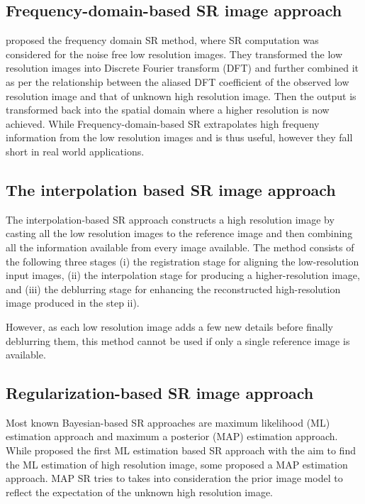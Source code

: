 \documentclass[12pt, letterpaper]{article}
\begin{document}
		\subsection{Frequency-domain-based SR image approach}
	  		\hspace*{0.25 in} \cite{tsai1984multiframe} proposed the frequency domain SR method, where SR computation was considered for the noise free low resolution images. They transformed the low resolution images into Discrete Fourier transform (DFT) and further combined it as per the relationship between the aliased DFT coefficient of the observed low resolution image and that of unknown high resolution image. Then the output is transformed back into the spatial domain where a higher resolution is now achieved.
        \hspace*{0.25 in} While Frequency-domain-based SR extrapolates high frequeny information from the low resolution images and is thus useful, however they fall short in real world applications.

		\subsection{The interpolation based SR image approach}
			\hspace*{0.25 in} The interpolation-based SR approach constructs a high resolution image by casting all the low resolution images to the reference image and then combining all the information available from every image available.
			The method consists of the following three stages
			(i) the registration stage for aligning the low-resolution input images,
	    (ii) the interpolation stage for producing a higher-resolution image, and
			(iii) the deblurring stage for enhancing the
       reconstructed high-resolution image produced in the step ii).


			However, as each low resolution image adds a few new details before finally deblurring them, this method cannot be used if only a single reference image is available.

		\subsection{Regularization-based SR image approach}
		  \hspace*{0.25 in} Most known Bayesian-based SR approaches are
maximum likelihood (ML) estimation approach  and maximum a posterior (MAP) estimation approach.
    \hspace*{0.25 in}  While \citep{Brian1996ML} proposed the first ML estimation based SR approach with the aim to find the ML estimation of high resolution image, some proposed a MAP estimation approach. MAP SR tries to takes into consideration the prior image model to reflect the expectation of the unknown high resolution image.
\end{document}
